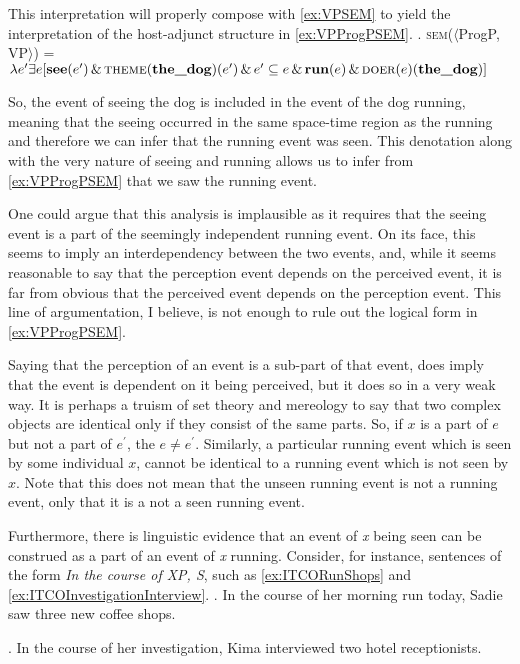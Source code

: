 This interpretation will properly compose with \cref{ex:VPSEM} to yield the interpretation of the host-adjunct structure in \cref{ex:VPProgPSEM}.
\ex.\label{ex:VPProgPSEM} \textsc{sem}($\langle$ProgP, VP$\rangle$) = $\lambda e^{\prime} \exists e [ \textbf{see}(e^{\prime})\,\&\,\textsc{theme}(\textbf{the\_dog})(e^{\prime})\,\&\,e^{\prime} \subseteq e\,\&\,\textbf{run}(e)\,\&\,\textsc{doer}(e)(\textbf{the\_dog})]$

So, the event of seeing the dog is included in the event of the dog running, meaning that the seeing occurred in the same space-time region as the running and therefore we can infer that the running event was seen.
This denotation along with the very nature of seeing and running allows us to infer from \cref{ex:VPProgPSEM} that we saw the running event.

One could argue that this analysis is implausible as it requires that the seeing event is a part of the seemingly independent running event.
On its face, this seems to imply an interdependency between the two events, and, while it seems reasonable to say that the perception event depends on the perceived event, it is far from obvious that the perceived event depends on the perception event.
This line of argumentation, I believe, is not enough to rule out the logical form in \cref{ex:VPProgPSEM}.


Saying that the perception of an event is a sub-part of that event, does imply that the event is dependent on it being perceived, but it does so in a very weak way.
It is perhaps a truism of set theory and mereology to say that two complex objects are identical only if they consist of the same parts.
So, if $x$ is a part of $e$ but not a part of $e^{\prime}$, the $e \neq e^{\prime}$.
Similarly, a particular running event which is seen by some individual $x$, cannot be identical to a running event which is not seen by $x$.
Note that this does not mean that the unseen running event is not a running event, only that it is a not a seen running event.

Furthermore, there is linguistic evidence that an event of \textit{x} being seen can be construed as a part of an event of \textit{x} running.
Consider, for instance, sentences of the form \textit{In the course of XP, S}, such as \cref{ex:ITCORunShops} and \cref{ex:ITCOInvestigationInterview}.
\ex.\label{ex:ITCORunShops} In the course of her morning run today, Sadie saw three new coffee shops.

\ex.\label{ex:ITCOInvestigationInterview} In the course of her investigation, Kima interviewed two hotel receptionists.

